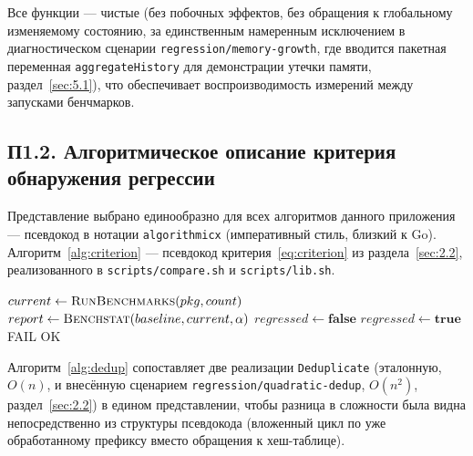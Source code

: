 Все функции — чистые (без побочных эффектов, без обращения к глобальному
изменяемому состоянию, за единственным намеренным исключением в
диагностическом сценарии \texttt{regression/\allowbreak memory-growth}, где вводится
пакетная переменная \texttt{aggregateHistory} для демонстрации утечки
памяти, раздел~\ref{sec:5.1}), что обеспечивает воспроизводимость измерений
между запусками бенчмарков.

\subsection*{П1.2. Алгоритмическое описание критерия обнаружения регрессии}

Представление выбрано единообразно для всех алгоритмов данного приложения —
псевдокод в нотации \texttt{algorithmicx} (императивный стиль, близкий к
Go). Алгоритм~\ref{alg:criterion} — псевдокод критерия~\eqref{eq:criterion}
из раздела~\ref{sec:2.2}, реализованного в \texttt{scripts/\allowbreak compare.sh} и
\texttt{scripts/\allowbreak lib.sh}.

\begin{algorithm}[htbp]
\caption{Обнаружение регрессии производительности}
\label{alg:criterion}
\begin{algorithmic}[1]
  \State $current \gets \Call{RunBenchmarks}{pkg, count}$ 
  \State $report \gets \Call{Benchstat}{baseline, current, \alpha}$ 
  \State $regressed \gets \textbf{false}$
   
      \State $regressed \gets \textbf{true}$
      \State {}
    \EndIf
  \EndFor
    \State \Return FAIL 
  \Else
    \State \Return OK
  \EndIf
\EndFunction
\end{algorithmic}
\end{algorithm}

Алгоритм~\ref{alg:dedup} сопоставляет две реализации \texttt{Deduplicate}
(эталонную, $O(n)$, и внесённую сценарием \texttt{regression/\allowbreak quadratic-dedup},
$O(n^2)$, раздел~\ref{sec:2.2}) в едином представлении, чтобы разница в
сложности была видна непосредственно из структуры псевдокода (вложенный
цикл по уже обработанному префиксу вместо обращения к хеш-таблице).

